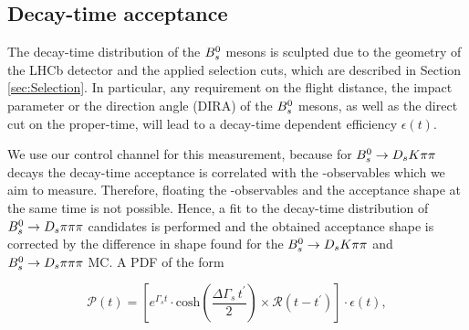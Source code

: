 \clearpage

\subsection{Decay-time acceptance}
\label{sec:timeAcceptance}
The decay-time distribution of the ${{B}^0_{s}}$ mesons is sculpted due to the geometry of the LHCb detector and the applied selection cuts, which are described in Section \ref{sec:Selection}.
In particular, any requirement on the flight distance, the impact parameter or the direction angle (DIRA) of the ${{B}^0_{s}}$ mesons, as well as the direct cut on the proper-time, will lead to a decay-time dependent efficiency $\epsilon(t)$. 


We use our control channel for this measurement, because for ${{B}^0_{s}}\rightarrow{\ensuremath{{D}_{s}}}{\ensuremath{K}}{\ensuremath{\pi}}{\ensuremath{\pi}}$ decays the decay-time acceptance is correlated with the \CP-observables which we aim to measure. Therefore, floating the \CP-observables and the acceptance shape at the same time is not possible. 
Hence, a fit to the decay-time distribution of ${{B}^0_{s}}\rightarrow{\ensuremath{{D}_{s}}}{\ensuremath{\pi}}{\ensuremath{\pi}}{\ensuremath{\pi}}$ candidates is performed and the obtained acceptance shape is corrected by the difference in shape found for the ${{B}^0_{s}}\rightarrow{\ensuremath{{D}_{s}}}{\ensuremath{K}}{\ensuremath{\pi}}{\ensuremath{\pi}}$ and ${{B}^0_{s}}\rightarrow{\ensuremath{{D}_{s}}}{\ensuremath{\pi}}{\ensuremath{\pi}}{\ensuremath{\pi}}$ MC. \newline
A PDF of the form

\begin{equation}
\mathcal{P}(t) = \left[ e^{\Gamma_{s}t}\cdot \text{cosh}\left(\frac{\Delta\Gamma_{s} \, t^\prime}{2}\right) \times \mathcal{R}(t - t^{'})\right] \cdot \epsilon(t),
\label{eq:AccPDF}
\end{equation}

